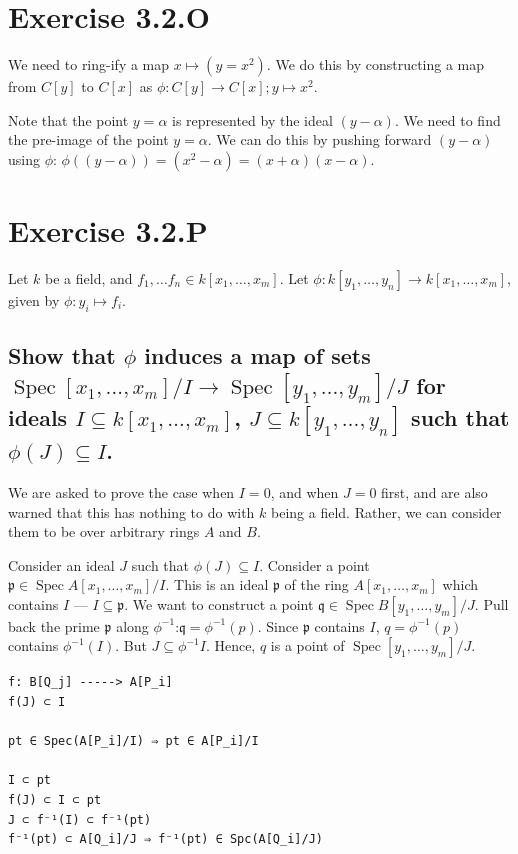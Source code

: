 \documentclass{book}
\newcommand{\Spec}{\operatorname{Spec}}
\newcommand{\p}{\mathfrak{p}}
\newcommand{\q}{\mathfrak{q}}
\theoremstyle{definition}
\begin{document}
\section{Exercise 3.2.O}


We need to ring-ify a map $x \mapsto (y = x^2)$. We do this by constructing
a map from $C[y]$ to $C[x]$ as $\phi: C[y] \rightarrow C[x]; y \mapsto x^2$.

Note that the point $y = \alpha$ is represented by the ideal $(y - \alpha)$. We
need to find the pre-image of the point $y = \alpha$. We can do this
by pushing forward $(y - \alpha)$ using $\phi$: $\phi((y - \alpha)) = (x^2 - \alpha) = (x + \alpha) (x - \alpha)$.

\section{Exercise 3.2.P} 
Let $k$ be a field, and $f_1, \dots f_n \in k[x_1, \dots, x_m]$.
Let $\phi: k[y_1, \dots, y_n] \rightarrow k[x_1, \dots, x_m]$, given
by $\phi: y_i \mapsto f_i$. 

\subsection{Show that $\phi$ induces a map of sets $\Spec[x_1, \dots, x_m]/I \rightarrow \Spec[y_1, \dots, y_m]/J$
for ideals $I \subseteq k[x_1, \dots, x_m]$, $J \subseteq k[y_1, \dots, y_n]$ such that $\phi(J) \subseteq I$.}
We are asked to prove the case when $I = 0$, and when $J = 0$ first, and are also warned
that this has nothing to do with $k$ being a field. Rather, we can consider
them to be over arbitrary rings $A$ and $B$.

Consider an ideal $J$ such that $\phi(J) \subseteq I$. Consider
a point  $\p \in \Spec A[x_1, \dots, x_m]/I$. This is an ideal $\p$ of the
ring $A[x_1, \dots, x_m]$ which contains $I$ --- $I \subseteq \p$. We want
to construct a point $\q \in \Spec B[y_1, \dots, y_m]/J$. Pull back the
prime $\p$ along $\phi^{-1}$:$ \q = \phi^{-1}(p)$. Since $\p$ contains $I$,
$q = \phi^{-1}(p)$ contains $\phi^{-1}(I)$. But $J \subseteq \phi^{-1} I$. Hence,
$q$ is a point of $\Spec[y_1, \dots, y_m]/J$.



\begin{verbatim}
f: B[Q_j] -----> A[P_i]
f(J) ⊂ I

pt ∈ Spec(A[P_i]/I) ⇒ pt ∈ A[P_i]/I

I ⊂ pt
f(J) ⊂ I ⊂ pt
J ⊂ f⁻¹(I) ⊂ f⁻¹(pt)
f⁻¹(pt) ⊂ A[Q_i]/J ⇒ f⁻¹(pt) ∈ Spc(A[Q_i]/J)
\end{verbatim}
\end{document}

